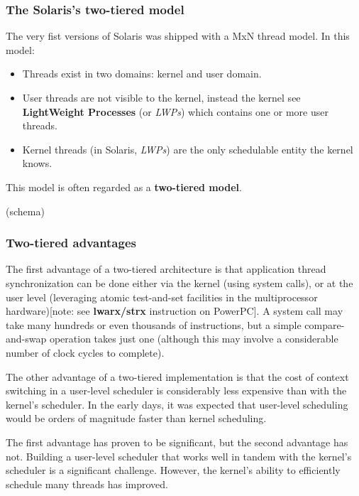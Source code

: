 
\begin{frame}
\frametitle{The Solaris's two-tiered model}

The very fist versions of Solaris was shipped with a MxN thread model. In this model:

\begin{itemize}
\item
Threads exist in two domains: kernel and user domain.
\item
User threads are not visible to the kernel, instead the kernel see \textbf{LightWeight Processes} (or \textit{LWPs}) which contains one or more user threads.
\item
Kernel threads (in Solaris, \textit{LWPs}) are the only schedulable entity the kernel knows.
\end{itemize}

\-

This model is often regarded as a \textbf{two-tiered model}.

\-

(schema)

\end{frame}


\begin{frame}
\frametitle{Two-tiered advantages}

The first advantage of a two-tiered architecture is that application thread synchronization can be done either via the kernel (using system calls), or at the user level (leveraging atomic test-and-set facilities in the multiprocessor hardware)[note: see \textbf{lwarx/strx} instruction on PowerPC]. A system call may take many hundreds or even thousands of instructions, but a simple compare-and-swap operation takes just one (although this may involve a considerable number of clock cycles to complete).

\-

The other advantage of a two-tiered implementation is that the cost of context switching in a user-level scheduler is considerably less expensive than with the kernel's scheduler. In the early days, it was expected that user-level scheduling would be orders of magnitude faster than kernel scheduling.

\-

The first advantage has proven to be significant, but the second advantage has not. Building a user-level scheduler that works well in tandem with the kernel's scheduler is a significant challenge. However, the kernel's ability to efficiently schedule many threads has improved.

\end{frame}

